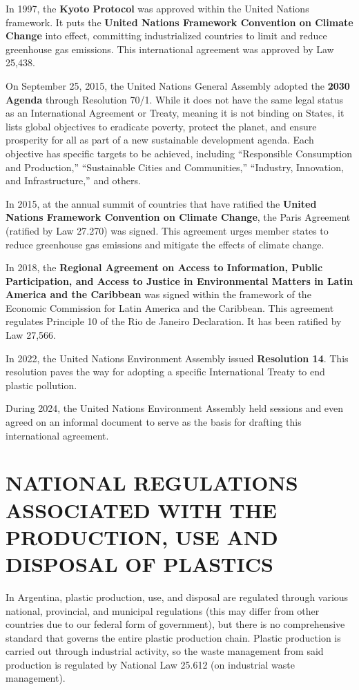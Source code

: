 \documentclass[
  12pt,
  oneside]{book}
\begin{document}
In 1997, the \textbf{Kyoto Protocol} was approved within the United
Nations framework. It puts the \textbf{United Nations Framework
Convention on Climate Change} into effect, committing industrialized
countries to limit and reduce greenhouse gas emissions. This
international agreement was approved by Law 25,438.

On September 25, 2015, the United Nations General Assembly adopted the
\textbf{2030 Agenda} through Resolution 70/1. While it does not have the
same legal status as an International Agreement or Treaty, meaning it is
not binding on States, it lists global objectives to eradicate poverty,
protect the planet, and ensure prosperity for all as part of a new
sustainable development agenda. Each objective has specific targets to
be achieved, including ``Responsible Consumption and Production,''
``Sustainable Cities and Communities,'' ``Industry, Innovation, and
Infrastructure,'' and others.

In 2015, at the annual summit of countries that have ratified the
\textbf{United Nations Framework Convention on Climate Change}, the
Paris Agreement (ratified by Law 27.270) was signed. This agreement
urges member states to reduce greenhouse gas emissions and mitigate the
effects of climate change.

In 2018, the \textbf{Regional Agreement on Access to Information, Public
Participation, and Access to Justice in Environmental Matters in Latin
America and the Caribbean} was signed within the framework of the
Economic Commission for Latin America and the Caribbean. This agreement
regulates Principle 10 of the Rio de Janeiro Declaration. It has been
ratified by Law 27,566.

In 2022, the United Nations Environment Assembly issued
\textbf{Resolution 14}. This resolution paves the way for adopting a
specific International Treaty to end plastic pollution.

During 2024, the United Nations Environment Assembly held sessions and
even agreed on an informal document to serve as the basis for drafting
this international agreement.

\section{NATIONAL REGULATIONS ASSOCIATED WITH THE PRODUCTION, USE AND
DISPOSAL OF
PLASTICS}\label{national-regulations-associated-with-the-production-use-and-disposal-of-plastics}

In Argentina, plastic production, use, and disposal are regulated
through various national, provincial, and municipal regulations (this
may differ from other countries due to our federal form of government),
but there is no comprehensive standard that governs the entire plastic
production chain. Plastic production is carried out through industrial
activity, so the waste management from said production is regulated by
National Law 25.612 (on industrial waste management).
\end{document}
